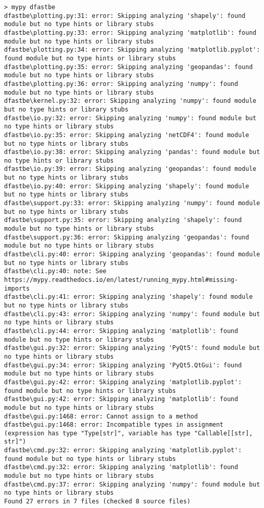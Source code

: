 \begin{Verbatim}[fontsize=\tiny]
> mypy dfastbe
dfastbe\plotting.py:31: error: Skipping analyzing 'shapely': found module but no type hints or library stubs
dfastbe\plotting.py:33: error: Skipping analyzing 'matplotlib': found module but no type hints or library stubs
dfastbe\plotting.py:34: error: Skipping analyzing 'matplotlib.pyplot': found module but no type hints or library stubs
dfastbe\plotting.py:35: error: Skipping analyzing 'geopandas': found module but no type hints or library stubs
dfastbe\plotting.py:36: error: Skipping analyzing 'numpy': found module but no type hints or library stubs
dfastbe\kernel.py:32: error: Skipping analyzing 'numpy': found module but no type hints or library stubs
dfastbe\io.py:32: error: Skipping analyzing 'numpy': found module but no type hints or library stubs
dfastbe\io.py:35: error: Skipping analyzing 'netCDF4': found module but no type hints or library stubs
dfastbe\io.py:38: error: Skipping analyzing 'pandas': found module but no type hints or library stubs
dfastbe\io.py:39: error: Skipping analyzing 'geopandas': found module but no type hints or library stubs
dfastbe\io.py:40: error: Skipping analyzing 'shapely': found module but no type hints or library stubs
dfastbe\support.py:33: error: Skipping analyzing 'numpy': found module but no type hints or library stubs
dfastbe\support.py:35: error: Skipping analyzing 'shapely': found module but no type hints or library stubs
dfastbe\support.py:36: error: Skipping analyzing 'geopandas': found module but no type hints or library stubs
dfastbe\cli.py:40: error: Skipping analyzing 'geopandas': found module but no type hints or library stubs
dfastbe\cli.py:40: note: See https://mypy.readthedocs.io/en/latest/running_mypy.html#missing-imports
dfastbe\cli.py:41: error: Skipping analyzing 'shapely': found module but no type hints or library stubs
dfastbe\cli.py:43: error: Skipping analyzing 'numpy': found module but no type hints or library stubs
dfastbe\cli.py:44: error: Skipping analyzing 'matplotlib': found module but no type hints or library stubs
dfastbe\gui.py:32: error: Skipping analyzing 'PyQt5': found module but no type hints or library stubs
dfastbe\gui.py:34: error: Skipping analyzing 'PyQt5.QtGui': found module but no type hints or library stubs
dfastbe\gui.py:42: error: Skipping analyzing 'matplotlib.pyplot': found module but no type hints or library stubs
dfastbe\gui.py:42: error: Skipping analyzing 'matplotlib': found module but no type hints or library stubs
dfastbe\gui.py:1468: error: Cannot assign to a method
dfastbe\gui.py:1468: error: Incompatible types in assignment (expression has type "Type[str]", variable has type "Callable[[str], str]")
dfastbe\cmd.py:32: error: Skipping analyzing 'matplotlib.pyplot': found module but no type hints or library stubs
dfastbe\cmd.py:32: error: Skipping analyzing 'matplotlib': found module but no type hints or library stubs
dfastbe\cmd.py:37: error: Skipping analyzing 'numpy': found module but no type hints or library stubs
Found 27 errors in 7 files (checked 8 source files)
\end{Verbatim}

